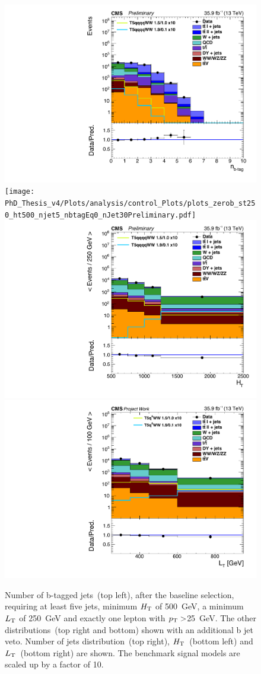  \begin{figure}[!hbt]
    \begin{center}
 \includegraphics[width=0.45 \textwidth]{Plots/analysis/control_Plots/nBjet0b}
 \texttt{[image: PhD\_Thesis\_v4/Plots/analysis/control\_Plots/plots\_zerob\_st250\_ht500\_njet5\_nbtagEq0\_nJet30Preliminary.pdf]}\\
 \includegraphics[width=0.45 \textwidth]{Plots/analysis/control_Plots/plots_zerob_st250_ht500_njet5_nbtagEq0_htJet30jPreliminary}
 \includegraphics[width=0.45 \textwidth]{Plots/analysis/control_Plots/LT_colors}
  \caption[Main kinematic distributions after baseline selection]{ \label{fig:baselineplots} Number of b-tagged jets~(top left), after the baseline selection, requiring at least five jets, minimum $H_{\rm T}$ of 500~GeV, a minimum $L_{\rm T}$ of 250~GeV and exactly one lepton with $p_{\rm T} >$25~GeV. The other distributions~(top right and bottom) shown with an additional b jet veto. Number of jets distribution~(top right), $H_{\rm T}$~(bottom left) and $L_{\rm T}$~(bottom right) are shown.
  The benchmark signal models are scaled up by a factor of 10.
  }
   \end{center}
\end{figure}

